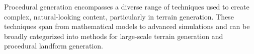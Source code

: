 






Procedural generation encompasses a diverse range of techniques used to create complex, natural-looking content, particularly in terrain generation. These techniques span from mathematical models to advanced simulations and can be broadly categorized into methods for large-scale terrain generation and procedural landform generation. 

